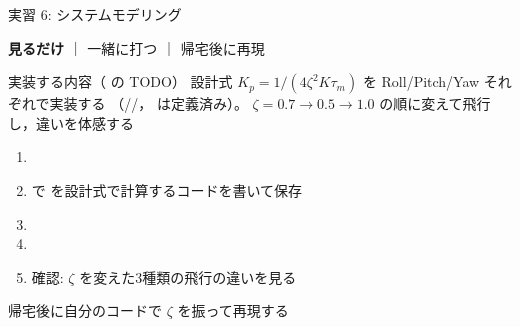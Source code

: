 \begin{frame}[fragile]{実習 6: システムモデリング}
  \vspace{0.15em}

  {\footnotesize \textcolor{sfblue}{\textbf{見るだけ}} ｜ 一緒に打つ ｜ 帰宅後に再現}

  \vspace{0.3em}

  \begin{block}{実装する内容（ の TODO）}\footnotesize
    設計式 $K_p=1/(4\zeta^2 K \tau_m)$ を Roll/Pitch/Yaw それぞれで実装する
    （//， は定義済み）。
    $\zeta=0.7\to0.5\to1.0$ の順に変えて飛行し，違いを体感する
  \end{block}

  \begin{enumerate}\footnotesize\setlength{\itemsep}{0pt}
    \item {}
    \item {} で  を設計式で計算するコードを書いて保存
    \item {}
    \item {}
    \item 確認: $\zeta$ を変えた3種類の飛行の違いを見る
  \end{enumerate}

  {\footnotesize 帰宅後に自分のコードで $\zeta$ を振って再現する}
\end{frame}

